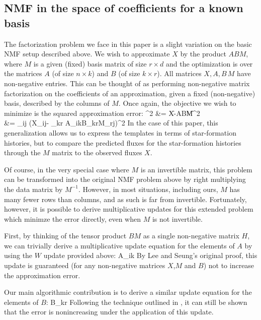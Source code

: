 \documentclass[10pt,preprint]{aastex}
\def\beq#1\eeq{\begin{equation}#1\end{equation}}
\def\beqa#1\eeqa{\begin{align}#1\end{align}}
\newcommand{\T}{^{\scriptscriptstyle \top}}
\newcommand{\inv}{^{-1}}
\newcommand{\XX}{X}
\newcommand{\Xij}{X_{ij}}
\renewcommand{\AA}{A}
\newcommand{\WW}{W}
\newcommand{\HH}{H}
\newcommand{\BB}{B}
\newcommand{\MM}{M}
\newcommand{\Aik}{A_{ik}}
\newcommand{\Bkr}{B_{kr}}
\newcommand{\Mrj}{M_{rj}}
\begin{document}
\subsection{NMF in the space of coefficients for a known basis}
The factorization problem we face in this paper is a slight variation on the
basic NMF setup described above. We wish to approximate $\XX$ by the
product $\AA\BB\MM$, 
where $\MM$ is a given (fixed) basis matrix of size $r \times d$
and the optimization is over the matrices $\AA$ (of size
$n\times k$) and $\BB$ (of size $k\times r$). All matrices
$\XX,\AA,\BB\,\MM$ have non-negative entries. This can be thought of
as performing non-negative matrix factorization on the coefficients of
an approximation, given a fixed (non-negative) basis, described by the
columns of $\MM$. Once again, the objective we wish to minimize is the
squared approximation error: 
\beqa
\chi^2 &= \|\XX-\AA\BB\MM\|^2\\
&= \sum_{ij} \left(\Xij - \sum_{kr} \Aik\Bkr\Mrj \right)^2
\eeqa
In the case of this paper, this generalization allows us to express
the templates in terms of star-formation histories, but to compare the
predicted fluxes for the star-formation histories through the $\MM$
matrix to the observed fluxes $\XX$.

Of course, in the very special case where $\MM$ is an invertible
matrix, this problem can be transformed into the original NMF problem above by
right multiplying the data matrix by $\MM\inv$. However, in most
situations, including ours, $\MM$ has many fewer rows than columns, and
as such is far from invertible. Fortunately, however, it is possible
to derive multiplicative updates for this extended problem 
which minimze the error directly, even when $\MM$ is not invertible.

First, by thinking of the tensor product $\BB\MM$ as a single
non-negative matrix $\HH$, we can trivially derive a multiplicative
update equation for the elements of $\AA$ by using the $\WW$ update
provided above: 
\beq
\Aik \leftarrow \Aik 
\frac{[\XX\MM\T\BB\T]_{ik}}{[\AA\BB\MM\MM\T\BB\T]_{ik}}
\eeq
By Lee and Seung's original proof, this update is guaranteed (for any
non-negative matrices $\XX$,$\MM$ and $\BB$) not to increase the
approximation error. 

Our main algorithmic contribution is to derive a similar update equation
for the elements of $\BB$:
\beq
\Bkr \leftarrow \Bkr
\frac{[\AA\T\XX\MM\T]_{kr}}{[\AA\T\AA\BB\MM\MM\T]_{kr}}
\eeq
Following the technique outlined in \cite{??}, it can still be shown
that the error is nonincreasing under the application of this update.
\end{document}
